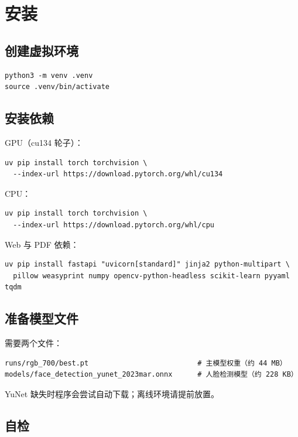 \documentclass[12pt,a4paper]{article}
\begin{document}
\section{安装}

\subsection{创建虚拟环境}

\begin{lstlisting}
python3 -m venv .venv
source .venv/bin/activate
\end{lstlisting}

\subsection{安装依赖}

GPU（cu134 轮子）：

\begin{lstlisting}
uv pip install torch torchvision \
  --index-url https://download.pytorch.org/whl/cu134
\end{lstlisting}

CPU：

\begin{lstlisting}
uv pip install torch torchvision \
  --index-url https://download.pytorch.org/whl/cpu
\end{lstlisting}

Web 与 PDF 依赖：

\begin{lstlisting}
uv pip install fastapi "uvicorn[standard]" jinja2 python-multipart \
  pillow weasyprint numpy opencv-python-headless scikit-learn pyyaml tqdm
\end{lstlisting}

\subsection{准备模型文件}

需要两个文件：

\begin{lstlisting}
runs/rgb_700/best.pt                          # 主模型权重（约 44 MB）
models/face_detection_yunet_2023mar.onnx      # 人脸检测模型（约 228 KB）
\end{lstlisting}

YuNet 缺失时程序会尝试自动下载；离线环境请提前放置。

\subsection{自检}
\end{document}
